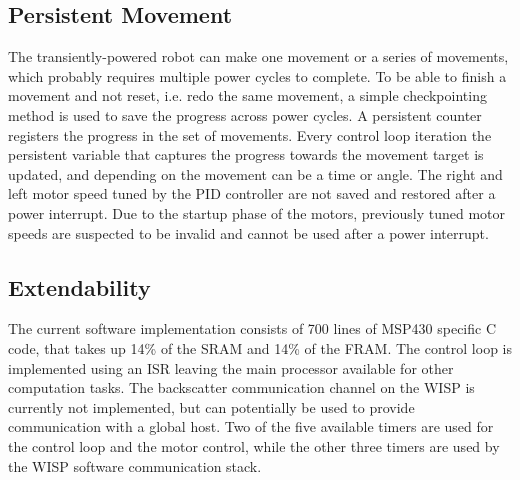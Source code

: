 \subsection{Persistent Movement}
The transiently-powered robot can make one movement or a series of movements, which probably requires multiple power cycles to complete.
To be able to finish a movement and not reset, i.e. redo the same movement, a simple checkpointing method is used to save the progress across power cycles.
A persistent counter registers the progress in the set of movements.
Every control loop iteration the persistent variable that captures the progress towards the movement target is updated, and depending on the movement can be a time or angle.
The right and left motor speed tuned by the PID controller are not saved and restored after a power interrupt.
Due to the startup phase of the motors, previously tuned motor speeds are suspected to be invalid and cannot be used after a power interrupt. 

\subsection{Extendability}
The current software implementation consists of 700 lines of MSP430 specific C code, that takes up 14\% of the SRAM and 14\% of the FRAM.
The control loop is implemented using an ISR leaving the main processor available for other computation tasks.
The backscatter communication channel on the WISP is currently not implemented, but can potentially be used to provide communication with a global host. 
Two of the five available timers are used for the control loop and the motor control, while the other three timers are used by the WISP software communication stack.